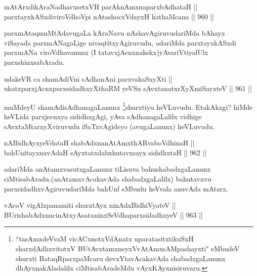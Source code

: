 
\begin{shl}
mAtArxdikAraNadhavxsetxVH parAknAmxnaparxbAdhataH || \\
parxtayxkASxdiviroVdhoV\s pi nAtashocxVdayxH kathaMcana \hfill || 960 ||  
\end{shl}

\begin{artha}
parxmAtaqmuMtAdavugaLa kAraNavu nAshavAgiruvudariMda bAhayx viSayada parxmANagaLige nivaqtitxyAgiruvudu, adariMda parxtayxkASxdi parxmANa viroVdhavanunx (I tatavxjAcnxnakekx)yAvariVtiyalUlx parxshinxsabAradu.
\end{artha}

\begin{shl}
udakeVR ca shamAdiVni sAdhanAni parxvakaSxyXti || \\
ukatxparxjAcnxparxsidadhxyXthaRM yeVSu sAvxtanatxrXyXmiSayxteV \hfill || 961 ||  
\end{shl}

\begin{artha}
muMdeyU shamAdisAdhanagaLanunx \footnote{``tasAmxdeVvaM vicACxnotxVdAnatx uparatasitxtikuSxH sharxdAdhxvitotxV BUtAvx\s\s tamxneyxVvA\s\s tAmxsAMpashayxti" eMbudeV shurxti BataqRparxpaMcaru devxYtavAcakavAda shabadxgaLanunx dhAyxnakAladalilx ciMtisabAradeMdu vAyxKAyxnisiruvaru.}shurxtiyu heVLuvudu. EtakAkxgi? hiMde heVLida parxjecnxya sididhxgAgi, yAva sAdhanagaLalilx vidhige sAvxtaMtarxyXviruvudu iSaTxvAgideyo (avugaLanunx) heVLuvudu.
\end{artha}


\begin{shl}
nABidhAyxyeVdataH shabAdxnanAtAmxthARvaboVdhinaH || \\
bahUnitayxnuvAdaH sAyxtatxdabxhutavxsayx sididhxtaH \hfill || 962 || 
\end{shl}

\begin{artha}
adariMda anAtamxvasutxgaLanunx tiLisuva bahushabadxgaLanunx ciMtisabAradu.(anAtamxvAcakavAda shabadxgaLalilx) bahutavxvu parxsidadhxvAgiruvudariMda bahUnf eMbudu keVvala anuvAda mAtarx.
\end{artha}

\begin{shl}
vAcoV vigAlxpanamiti shurxtAyx ninAdx\s BidhiVyateV ||  \\
BUrishabAdxnucinAtxyAsatxninxSeVdhaparxsidadhxyeV \hfill || 963 ||  
\end{shl}

